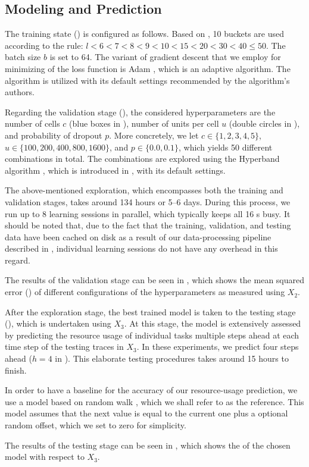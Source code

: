 \subsection{Modeling and Prediction}
The training state () is configured as follows. Based on
, 10 buckets are used according to the rule: $l < 6 < 7 < 8 < 9
< 10 < 15 < 20 < 30 < 40 \leq 50$. The batch size $b$ is set to 64. The variant
of gradient descent that we employ for minimizing of the loss function is Adam
\cite{kingma2014}, which is an adaptive algorithm. The algorithm is utilized
with its default settings recommended by the algorithm's authors.


Regarding the validation stage (), the considered
hyperparameters are the number of cells $c$ (blue boxes in ), number
of units per cell $u$ (double circles in ), and probability of
dropout $p$. More concretely, we let $c \in \{1, 2, 3, 4, 5\}$, $u \in \{100,
200, 400, 800, 1600\}$, and $p \in \{0.0, 0.1\}$, which yields 50 different
combinations in total. The combinations are explored using the Hyperband
algorithm \cite{li2016}, which is introduced in , with its
default settings.

The above-mentioned exploration, which encompasses both the training and
validation stages, takes around 134 hours or 5--6 days. During this process, we
run up to 8 learning sessions in parallel, which typically keeps all 16
s busy. It should be noted that, due to the fact that the training,
validation, and testing data have been cached on disk as a result of our
data-processing pipeline described in , individual learning sessions
do not have any overhead in this regard.

The results of the validation stage can be seen in , which
shows the mean squared error () of different configurations of the
hyperparameters as measured using $X_2$.

After the exploration stage, the best trained model is taken to the testing
stage (), which is undertaken using $X_3$. At this stage, the
model is extensively assessed by predicting the resource usage of individual
tasks multiple steps ahead at each time step of the testing traces in $X_3$.
In these experiments, we predict four steps ahead ($h = 4$ in ).
This elaborate testing procedures takes around 15 hours to finish.

In order to have a baseline for the accuracy of our resource-usage prediction,
we use a model based on random walk \cite{hastie2009}, which we shall refer to
as the reference. This model assumes that the next value is equal to the current
one plus a optional random offset, which we set to zero for simplicity.


The results of the testing stage can be seen in , which shows the
 of the chosen model with respect to $X_3$.

